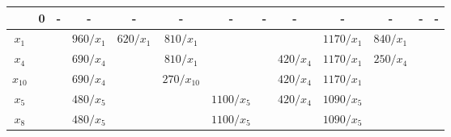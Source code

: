\documentclass[12pt]{article}
\begin{document}
\begin{enumerate}
{\begin{tabular}{|c|c|c|c|c|c|c|c|c|c|c|c|c|}
         & {\color[HTML]{FE0000} \textbf{0}} & -                                & -                                & -                                & -                                   & -                                & -                                & -                                & -                                    & -                                & -                                   & -                                \\ \hline
$x_1$    &                                   &                                  & $960/x_1$                        & {\color[HTML]{FE0000} $620/x_1$} & $810/x_1$                           &                                  &                                  &                                  & $1170/x_1$                           & $840/x_1$                        &                                     &                                  \\ \hline
$x_4$    &                                   &                                  & $690/x_4$                        &                                  & $810/x_1$                           &                                  &                                  & $420/x_4$                        & $1170/x_1$                           & {\color[HTML]{FE0000} $250/x_4$} &                                     &                                  \\ \hline
$x_{10}$ &                                   &                                  & $690/x_4$                        &                                  & {\color[HTML]{FE0000} $270/x_{10}$} &                                  &                                  & $420/x_4$                        & $1170/x_1$                           &                                  &                                     &                                  \\ \hline
$x_5$    &                                   &                                  & $480/x_5$                        &                                  & \textbf{}                           & $1100/x_5$                       &                                  & {\color[HTML]{FE0000} $420/x_4$} & $1090/x_5$                           &                                  &                                     &                                  \\ \hline
$x_8$    &                                   &                                  & {\color[HTML]{FE0000} $480/x_5$} &                                  &                                     & $1100/x_5$                       &                                  &                                  & $1090/x_5$                           &                                  &                                     &                                  \\ \hline

\end{tabular}}
\end{enumerate}
\end{document}
